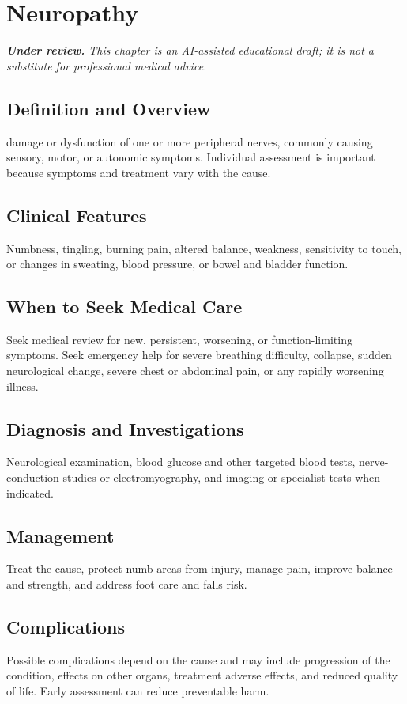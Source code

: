 \chapter{Neuropathy}

\medskip
\noindent\textit{\textbf{Under review.} This chapter is an AI-assisted educational draft; it is not a substitute for professional medical advice.}

\section*{Definition and Overview}
damage or dysfunction of one or more peripheral nerves, commonly causing sensory, motor, or autonomic symptoms. Individual assessment is important because symptoms and treatment vary with the cause.

\section*{Clinical Features}
Numbness, tingling, burning pain, altered balance, weakness, sensitivity to touch, or changes in sweating, blood pressure, or bowel and bladder function.

\section*{When to Seek Medical Care}
Seek medical review for new, persistent, worsening, or function-limiting symptoms. Seek emergency help for severe breathing difficulty, collapse, sudden neurological change, severe chest or abdominal pain, or any rapidly worsening illness.

\section*{Diagnosis and Investigations}
Neurological examination, blood glucose and other targeted blood tests, nerve-conduction studies or electromyography, and imaging or specialist tests when indicated.

\section*{Management}
Treat the cause, protect numb areas from injury, manage pain, improve balance and strength, and address foot care and falls risk.

\section*{Complications}
Possible complications depend on the cause and may include progression of the condition, effects on other organs, treatment adverse effects, and reduced quality of life. Early assessment can reduce preventable harm.

